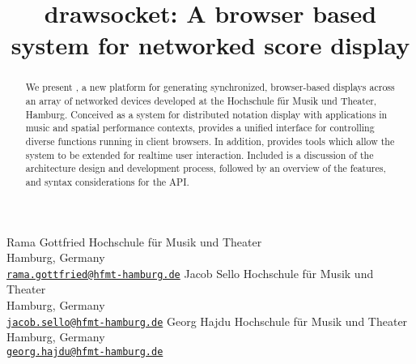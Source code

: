 

\def\papertitle{drawsocket: A browser based system for networked score display%
}
\def\firstauthor{Rama Gottfried}
\def\secondauthor{Jacob Sello}
\def\thirdauthor{Georg Hajdu}

\def\Hochschule{ Hochschule f\"ur Musik und Theater}

\title{\papertitle}
 \threeauthors
   {\firstauthor} {	
      Hochschule f\"ur Musik und Theater\\
         Hamburg, Germany \\ %
   \small{\tt \href{mailto:rama.gottfried@hfmt-hamburg.de}{rama.gottfried@hfmt-hamburg.de}}}
    {\secondauthor} {
   Hochschule f\"ur Musik und Theater\\
   Hamburg, Germany \\ %
   \small{\tt \href{mailto:jacob.sello@hfmt-hamburg.de}{jacob.sello@hfmt-hamburg.de}}}
   {\thirdauthor} {
   Hochschule f\"ur Musik und Theater\\
   Hamburg, Germany \\ %
   \small{\tt \href{mailto:georg.hajdu@hfmt-hamburg.de}{georg.hajdu@hfmt-hamburg.de}}}





%

\capstartfalse
\maketitle
\capstarttrue
%
\begin{abstract}
We present \drawsocket, a new platform for generating synchronized, browser-based displays across an array of networked devices developed at the \Hochschule, Hamburg. Conceived as a system for distributed notation display with applications in music and spatial performance contexts, \drawsocket provides a unified interface for controlling diverse functions running in client browsers. 
In addition, \drawsocket provides tools which allow the system to be extended for realtime user interaction.
Included is a discussion of the architecture design and development process, followed by an overview of the features, and syntax considerations for the \drawsocket API.

\end{abstract}



